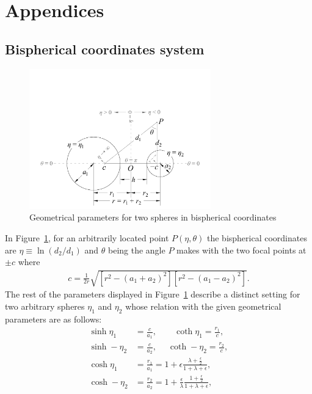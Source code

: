 \documentclass[../thesis.tex]{subfiles}
\begin{document}
\appendix
\renewcommand{\arraystretch}{1.25}
\section{Appendices}

\subsection{Bispherical coordinates system}
\begin{figure}[b!]
\center
\includegraphics[trim=15mm 05mm 15mm 60mm, clip, width=0.7\textwidth]{./figs/bispherical.pdf}
\caption{Geometrical parameters for two spheres in bispherical coordinates}
\label{fig:bispherical}
\end{figure}
In Figure~\ref{fig:bispherical}, for an arbitrarily located point $P(\eta,\theta)$ the bispherical coordinates are $\eta\equiv\ln(d_2/d_1)$ and $\theta$ being the angle $P$ makes with the two focal points at $\pm c$ where
\begin{eqnarray}
c = \frac{1}{2r}\sqrt{[r^2-(a_1+a_2)^2][r^2-(a_1-a_2)^2]}.\nonumber
\end{eqnarray}
The rest of the parameters displayed in Figure~\ref{fig:bispherical} describe a distinct setting for two arbitrary spheres $\eta_1$ and $\eta_2$ whose relation with the given geometrical parameters are as follows:
\begin{align}
\sinh\eta_1 &= \frac{c}{a_1}, \qquad
\coth\eta_1 = \frac{r_1}{c}, \nonumber
\\
\sinh-\eta_2 &= \frac{c}{a_2}, \; \quad
\coth-\eta_2 = \frac{r_2}{c}, \nonumber
\\
\cosh\eta_1 &= \frac{r_1}{a_1} = 1 + \epsilon\frac{\lambda+\frac{\epsilon}{2}}{1+\lambda+\epsilon}, \label{eq:zin1}
\\
\cosh-\eta_2 &= \frac{r_2}{a_2} = 1 + \frac{\epsilon}{\lambda}\frac{1 + \frac{\epsilon}{2}}{1+\lambda+\epsilon}, \label{eq:zin2}
\end{align}
\end{document}
